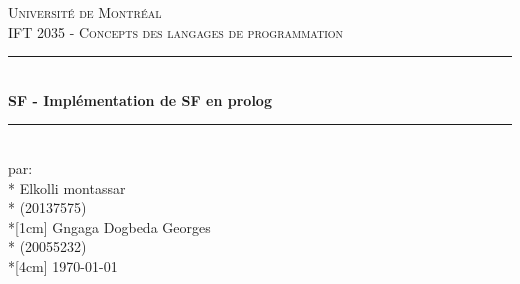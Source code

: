 \documentclass[12pt, letterpaper]{article}
\begin{document}
\begin{titlepage}
	\center
		
	\vspace*{2cm}
		
	\textsc{\LARGE Université de Montréal}\\[1cm] 
	\textsc{\Large IFT 2035 - Concepts des langages de programmation}\\[1.5cm] 
		
	\rule{\linewidth}{0.5mm} \\[0.5cm]
	{\LARGE \bfseries SF - Implémentation de SF en prolog } \\[0.2cm]
	\rule{\linewidth}{0.5mm} \\[3cm]
		
	\large par: \\*
	Elkolli montassar \\*
	(20137575) \\*[1cm]
	Gngaga Dogbeda Georges \\*
	(20055232) \\*[4cm] 
	{\large \today}\\[2cm]
		
	\vfill
\end{titlepage}
\newpage
\flushleft
\end{document}
